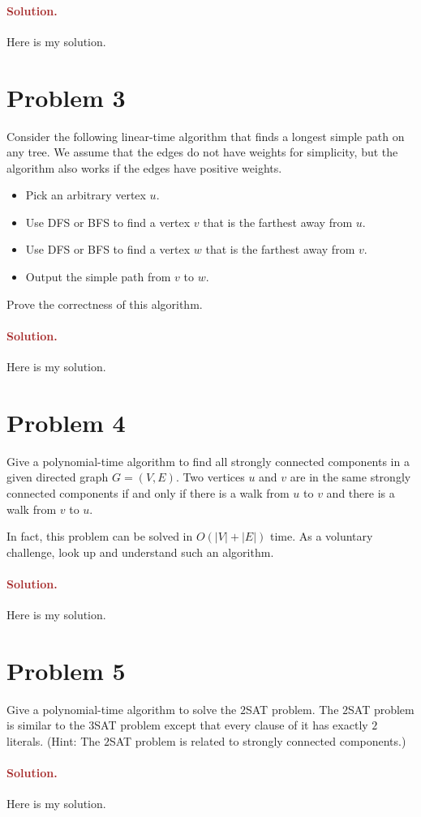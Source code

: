 \paragraph{\textcolor{brown}{Solution.}}
Here is my solution.


\section*{Problem 3}
Consider the following linear-time algorithm that finds a longest simple path on any tree. We assume that the edges do not have weights for simplicity, but the algorithm also works if the edges have positive weights.
\begin{itemize}
    \item Pick an arbitrary vertex $u$.
    \item Use DFS or BFS to find a vertex $v$ that is the farthest away from $u$.
    \item Use DFS or BFS to find a vertex $w$ that is the farthest away from $v$.
    \item Output the simple path from $v$ to $w$.
\end{itemize}
Prove the correctness of this algorithm.

\paragraph{\textcolor{brown}{Solution.}}
Here is my solution.


\section*{Problem 4}
Give a polynomial-time algorithm to find all strongly connected components in a given directed graph $G = (V, E)$. Two vertices $u$ and $v$ are in the same strongly connected components if and only if there is a walk from $u$ to $v$ and there is a walk from $v$ to $u$.

In fact, this problem can be solved in $O(|V| + |E|)$ time. As a voluntary challenge, look up and understand such an algorithm.

\paragraph{\textcolor{brown}{Solution.}}
Here is my solution.


\section*{Problem 5}
Give a polynomial-time algorithm to solve the $2$SAT problem. The $2$SAT problem is similar to the $3$SAT problem except that every clause of it has exactly $2$ literals. (Hint: The $2$SAT problem is related to strongly connected components.)

\paragraph{\textcolor{brown}{Solution.}}
Here is my solution.

